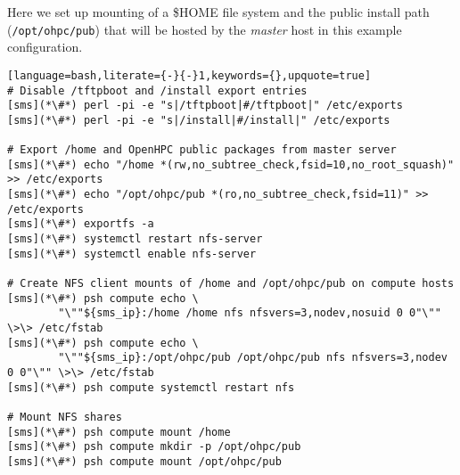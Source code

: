 Here we set up \NFS{}  mounting of a
\$HOME file system and the public \OHPC{} install path (\texttt{/opt/ohpc/pub})
that will be hosted by the {\em master} host in this  example configuration.

\vspace*{0.15cm}
\begin{lstlisting}[language=bash,literate={-}{-}1,keywords={},upquote=true]
# Disable /tftpboot and /install export entries
[sms](*\#*) perl -pi -e "s|/tftpboot|#/tftpboot|" /etc/exports
[sms](*\#*) perl -pi -e "s|/install|#/install|" /etc/exports

# Export /home and OpenHPC public packages from master server
[sms](*\#*) echo "/home *(rw,no_subtree_check,fsid=10,no_root_squash)" >> /etc/exports
[sms](*\#*) echo "/opt/ohpc/pub *(ro,no_subtree_check,fsid=11)" >> /etc/exports
[sms](*\#*) exportfs -a
[sms](*\#*) systemctl restart nfs-server
[sms](*\#*) systemctl enable nfs-server

# Create NFS client mounts of /home and /opt/ohpc/pub on compute hosts
[sms](*\#*) psh compute echo \
        "\""${sms_ip}:/home /home nfs nfsvers=3,nodev,nosuid 0 0"\"" \>\> /etc/fstab
[sms](*\#*) psh compute echo \
        "\""${sms_ip}:/opt/ohpc/pub /opt/ohpc/pub nfs nfsvers=3,nodev 0 0"\"" \>\> /etc/fstab
[sms](*\#*) psh compute systemctl restart nfs

# Mount NFS shares
[sms](*\#*) psh compute mount /home
[sms](*\#*) psh compute mkdir -p /opt/ohpc/pub
[sms](*\#*) psh compute mount /opt/ohpc/pub

\end{lstlisting}

